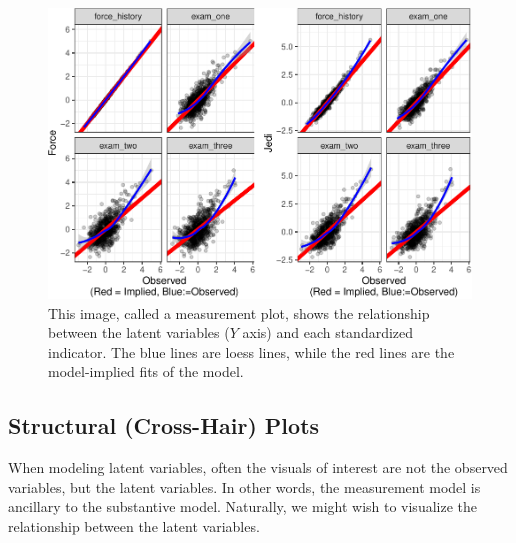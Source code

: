 \documentclass[
  english,
  man]{apa6}
\begin{document}
\begin{figure}

{\centering \includegraphics[width=0.9\linewidth]{flexplavaan_draft_files/figure-latex/measurementplot-1} 

}

\caption{This image, called a measurement plot, shows the relationship between the latent variables ($Y$ axis) and each standardized indicator. The blue lines are loess lines, while the red lines are the model-implied fits of the model.}\label{fig:measurementplot}
\end{figure}

\hypertarget{structural-cross-hair-plots}{%
\subsection{Structural (Cross-Hair) Plots}\label{structural-cross-hair-plots}}

When modeling latent variables, often the visuals of interest are not the observed variables, but the latent variables. In other words, the measurement model is ancillary to the substantive model. Naturally, we might wish to visualize the relationship between the latent variables.
\end{document}
